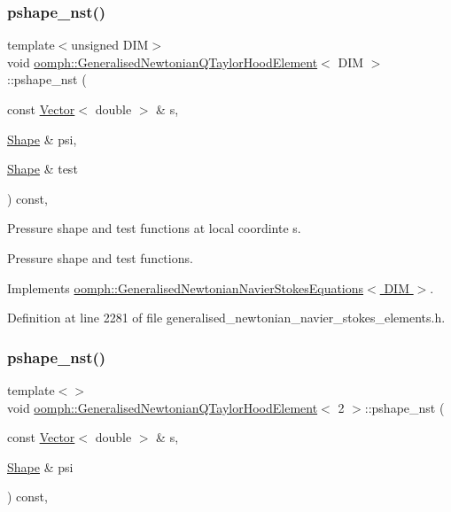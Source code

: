 \subsubsection{\texorpdfstring{pshape\+\_\+nst()}{pshape\_nst()}\hspace{0.1cm}{\footnotesize\ttfamily [2/4]}}
{\footnotesize\ttfamily template$<$unsigned D\+IM$>$ \\
void \hyperlink{classoomph_1_1GeneralisedNewtonianQTaylorHoodElement}{oomph\+::\+Generalised\+Newtonian\+Q\+Taylor\+Hood\+Element}$<$ D\+IM $>$\+::pshape\+\_\+nst (\begin{DoxyParamCaption}\item[{const \hyperlink{classoomph_1_1Vector}{Vector}$<$ double $>$ \&}]{s,  }\item[{\hyperlink{classoomph_1_1Shape}{Shape} \&}]{psi,  }\item[{\hyperlink{classoomph_1_1Shape}{Shape} \&}]{test }\end{DoxyParamCaption}) const\hspace{0.3cm}{\ttfamily [inline]}, {\ttfamily [virtual]}}



Pressure shape and test functions at local coordinte s. 

Pressure shape and test functions. 

Implements \hyperlink{classoomph_1_1GeneralisedNewtonianNavierStokesEquations_afb01a54f377b1bebe141ed8e11ced138}{oomph\+::\+Generalised\+Newtonian\+Navier\+Stokes\+Equations$<$ D\+I\+M $>$}.



Definition at line 2281 of file generalised\+\_\+newtonian\+\_\+navier\+\_\+stokes\+\_\+elements.\+h.

\mbox{\label{classoomph_1_1GeneralisedNewtonianQTaylorHoodElement_a4f55aebc396535f04ebdc2dce8e45ff0}} 
\subsubsection{\texorpdfstring{pshape\+\_\+nst()}{pshape\_nst()}\hspace{0.1cm}{\footnotesize\ttfamily [3/4]}}
{\footnotesize\ttfamily template$<$$>$ \\
void \hyperlink{classoomph_1_1GeneralisedNewtonianQTaylorHoodElement}{oomph\+::\+Generalised\+Newtonian\+Q\+Taylor\+Hood\+Element}$<$ 2 $>$\+::pshape\+\_\+nst (\begin{DoxyParamCaption}\item[{const \hyperlink{classoomph_1_1Vector}{Vector}$<$ double $>$ \&}]{s,  }\item[{\hyperlink{classoomph_1_1Shape}{Shape} \&}]{psi }\end{DoxyParamCaption}) const\hspace{0.3cm}{\ttfamily [inline]}, {\ttfamily [virtual]}}

